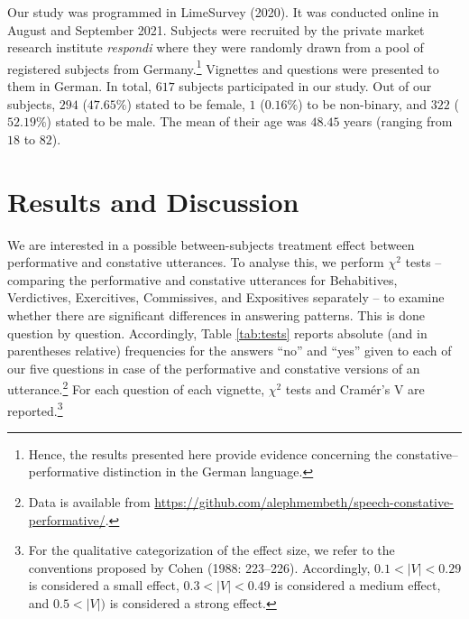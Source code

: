 \documentclass[egregdoesnotlikesansseriftitles,12pt]{scrartcl}
\begin{document}
Our study was programmed in LimeSurvey (2020). It was conducted online in August and September 2021. Subjects were recruited by the private market research institute \textit{respondi} where they were randomly drawn from a pool of registered subjects from Germany.\footnote{Hence, the results presented here provide evidence concerning the constative--performative distinction in the German language.} Vignettes and questions were presented to them in German. In total, $617$ subjects participated in our study. Out of our subjects, $294$ ($47.65\%$) stated to be female, $1$ ($0.16\%$) to be non-binary, and $322$ ($52.19\%$) stated to be male. The mean of their age was $48.45$ years (ranging from $18$ to $82$).


\section{Results and Discussion}\label{sec:results}
We are interested in a possible between-subjects treatment effect between performative and constative utterances. To analyse this, we perform $\chi^2$ tests -- comparing the performative and constative utterances for Behabitives, Verdictives, Exercitives, Commissives, and Expositives separately -- to examine whether there are significant differences in answering patterns. This is done question by question. Accordingly, Table \ref{tab:tests} reports absolute (and in parentheses relative) frequencies for the answers ``no'' and ``yes'' given to each of our five questions in case of the performative and constative versions of an utterance.\footnote{Data is available from \href{https://github.com/alephmembeth/speech-constative-performative/}{https://github.com/alephmembeth/speech-constative-performative/}.} For each question of each vignette, $\chi^2$ tests and Cramér's V are reported.\footnote{For the qualitative categorization of the effect size, we refer to the conventions proposed by Cohen (1988: 223--226). Accordingly, $0.1<|V|<0.29$ is considered a small effect, $0.3<|V|<0.49$ is considered a medium effect, and $0.5<|V|)$ is considered a strong effect.}
\end{document}
